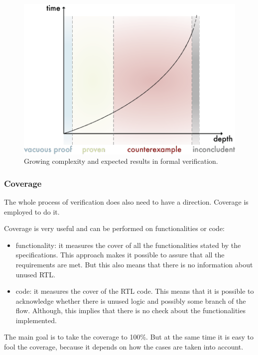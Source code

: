 \begin{figure}[H]
    \centering
    \includegraphics[scale = 0.65]{Chapter_1/img/for-com.png}
    \caption{Growing complexity and expected results in formal verification.}
    \label{for-com}
\end{figure}




\subsubsection{Coverage}
The whole process of verification does also need to have a direction. Coverage is employed to do it.

Coverage is very useful and can be performed on functionalities or code:
\begin{itemize}
    \item functionality: it measures the cover of all the functionalities stated by the specifications. This approach makes it possible to assure that all the requirements are met. But this also means that there is no information about unused RTL.
    
    \item code: it measures the cover of the RTL code. This means that it is possible to acknowledge whether there is unused logic and possibly some branch of the flow. Although, this implies that there is no check about the functionalities implemented.

\end{itemize}

The main goal is to take the coverage to 100\%. But at the same time it is easy to fool the coverage, because it depends on how the cases are taken into account.


